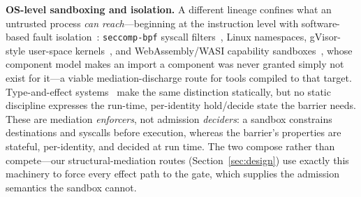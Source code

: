 \documentclass[10pt,journal,compsoc]{IEEEtran}
\begin{document}
\textbf{OS-level sandboxing and isolation.} A different lineage confines what
an untrusted process \emph{can reach}---beginning at the instruction level
with software-based fault isolation~\cite{wahbe93}: \texttt{seccomp-bpf}
syscall filters~\cite{seccomp}, Linux namespaces, gVisor-style user-space
kernels~\cite{gvisor19}, and WebAssembly/WASI capability sandboxes~\cite{wasi}, whose component model makes an import a component was never granted simply not exist for it---a viable mediation-discharge route for tools compiled to that target. Type-and-effect systems~\cite{lucassen88} make the same distinction statically, but no static discipline expresses the run-time, per-identity hold/decide state the barrier needs. These are mediation \emph{enforcers}, not admission \emph{deciders}: a sandbox constrains destinations and syscalls before execution, whereas the barrier's properties are stateful, per-identity, and decided at run time. The two compose rather than compete---our structural-mediation routes (Section~\ref{sec:design}) use exactly this machinery to force every effect path to the gate, which supplies the admission semantics the sandbox cannot.
\end{document}
